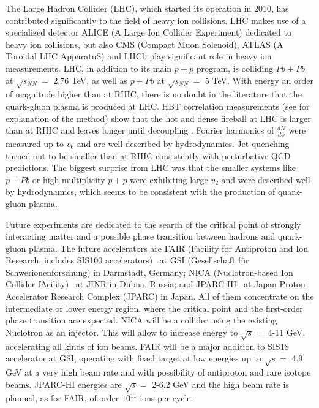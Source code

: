 The Large Hadron Collider (LHC), which started its operation in 2010, has
contributed significantly to the field of heavy ion collisions. LHC makes use
of a specialized detector ALICE (A Large Ion Collider Experiment) dedicated to
heavy ion collisions, but also CMS (Compact Muon Solenoid), ATLAS (A Toroidal
LHC ApparatuS) and LHCb play significant role in heavy ion measurements.  LHC,
in addition to its main $p+p$ program, is colliding $Pb+Pb$ at $\sqrt{s_{NN}} =
$ 2.76 TeV, as well as $p+Pb$ at $\sqrt{s_{NN}} = $ 5 TeV.
With energy an order of magnitude higher than at RHIC, there is no doubt in the
literature that the quark-gluon plasma is produced at LHC. HBT correlation 
measurements (see \cite{Lisa:2005dd} for explanation of the method) show
that the hot and dense fireball at LHC is larger than at RHIC and leaves longer
until decoupling \cite{Aamodt:2011mr}. Fourier harmonics of $\frac{dN}{d\phi}$
were measured up to $v_6$ and are well-described by hydrodynamics. Jet
quenching turned out to be smaller than at RHIC consistently with perturbative
QCD predictions. The biggest surprise from LHC was that the smaller systems like
$p+Pb$ or high-multiplicity $p+p$ were exhibiting large $v_2$ and were
described well by hydrodynamics, which seems to be consistent with the production
of quark-gluon plasma.

Future experiments are dedicated to the search of the critical point of strongly
interacting matter and a possible phase transition between hadrons and
quark-gluon plasma. The future accelerators are FAIR (Facility for Antiproton and Ion
Research, includes SIS100 accelerators)~\cite{Spiller:2006gj} at GSI
(Gesellschaft f\"ur Schwerionenforschung) in Darmstadt, Germany; NICA
(Nuclotron-based Ion Collider fAcility)~\cite{Kekelidze:2012zz} at JINR in
Dubna, Russia; and JPARC-HI~\cite{Sako:2015cqa} at Japan Proton Accelerator
Research Complex (JPARC) in Japan. All of them concentrate on the intermediate
or lower energy region, where the critical point and the first-order phase
transition are expected.  NICA will be a collider using the existing Nuclotron as
an injector.  This will allow to increase energy to $\sqrt{s} = $
4-11 GeV, accelerating all kinds of ion beams. FAIR will be a major
addition to SIS18 accelerator at GSI, operating with fixed target at low
energies up to $\sqrt{s} = $ 4.9 GeV at a very high beam rate and with
possibility of antiproton and rare isotope beams. JPARC-HI energies are
$\sqrt{s} = $ 2-6.2 GeV and the high beam rate is planned, as for FAIR,
of order $10^{11}$ ions per cycle.

